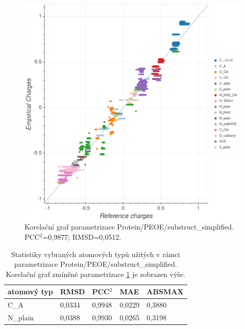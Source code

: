 \vspace*{0cm}
\begin{figure}[h]
\begin{center}
\includegraphics[width=12cm]{pictures/graph_peptidesimpl_PEOE.png}
\caption{Korelační graf parametrizace Protein/PEOE/substruct\_simplified. PCC$^2$=0,9877; RMSD=0,0512.}
\label{graph_peptidesimpl_PEOE}
\end{center}
\end{figure}

\begin{table}[H]
    \renewcommand{\arraystretch}{1.35}
    \centering
    \begin{tabular}{l|l|l|l|l}
         \textbf{atomový typ} &  \textbf{RMSD} & \textbf{PCC$^2$} & \textbf{MAE} & \textbf{ABSMAX} \\
         \hline
         C\_A & 0,0334 & 0,9948 & 0,0229 & 0,3880 \\
         N\_plain & 0,0388 & 0,9930 & 0,0265 & 0,3198 \\
    \end{tabular}
    \caption{Statistiky vybraných atomových typů užitých v rámci parametrizace Protein/PEOE/substruct\_simplified. Korelační graf zmíněné parametrizace \ref{graph_peptidesimpl_PEOE} je zobrazen výše.}
    \label{priloha_atom_types_statistics}
\end{table}